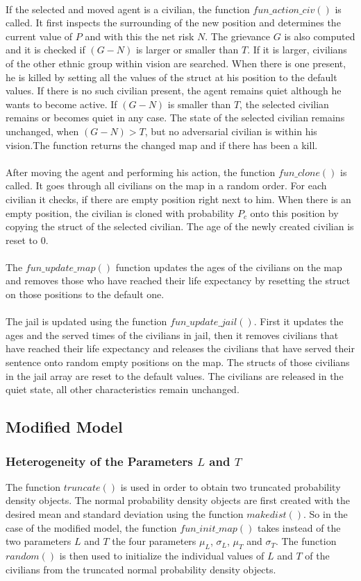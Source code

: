\documentclass[11pt]{article}
\begin{document}
\\
If the selected and moved agent is a civilian, the function $fun\_action\_civ()$ is called. It first inspects the surrounding of the new position and determines the current value of $P$ and with this the net risk $N$. The grievance $G$ is also computed and it is checked if $(G-N)$ is larger or smaller than $T$. If it is larger, civilians of the other ethnic group within vision are searched. When there is one present, he is killed by setting all the values of the struct at his position to the default values. If there is no such civilian present, the agent remains quiet although he wants to become active. If $(G-N)$ is smaller than $T$, the selected civilian remains or becomes quiet in any case. The state of the selected civilian remains unchanged, when $(G-N) > T$, but no adversarial civilian is within his vision.The function returns the changed map and if there has been a kill.\\
\\
After moving the agent and performing his action, the function $fun\_clone()$ is called. It goes through all civilians on the map in a random order. For each civilian it checks, if there are empty position right next to him. When there is an empty position, the civilian is cloned with probability $P_c$ onto this position by copying the struct of the selected civilian. The age of the newly created civilian is reset to 0.\\
\\
The $fun\_update\_map()$ function updates the ages of the civilians on the map and removes those who have reached their life expectancy by resetting the struct on those positions to the default one.\\
\\
The jail is updated using the function $fun\_update\_jail()$. First it updates the ages and the served times of the civilians in jail, then it removes civilians that have reached their life expectancy and releases the civilians that have served their sentence onto random empty positions on the map. The structs of those civilians in the jail array are reset to the default values. The civilians are released in the quiet state, all other characteristics remain unchanged.

\subsection{Modified Model}

\subsubsection{Heterogeneity of the Parameters $L$ and $T$}
The function $truncate()$ is used in order to obtain two truncated probability density objects. The normal probability density objects are first created with the desired mean and standard deviation using the function $makedist()$. So in the case of the modified model, the function $fun\_init\_map()$ takes instead of the two parameters $L$ and $T$ the four parameters $\mu_L$, $\sigma_L$, $\mu_T$ and $\sigma_T$. The function $random()$ is then used to initialize the individual values of $L$ and $T$ of the civilians from the truncated normal probability density objects.
\end{document}

